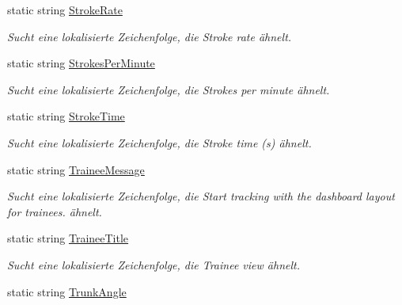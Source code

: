 \begin{DoxyCompactItemize}
static string \hyperlink{class_rowing_monitor_1_1_properties_1_1_resources_aabc0c41d4809bfc5722d408ce806b33f}{Stroke\+Rate}
\begin{DoxyCompactList}\small\item\em Sucht eine lokalisierte Zeichenfolge, die Stroke rate ähnelt. \end{DoxyCompactList}\item 
static string \hyperlink{class_rowing_monitor_1_1_properties_1_1_resources_afb08e8d0b2a23eb35c2474f4da6403f0}{Strokes\+Per\+Minute}
\begin{DoxyCompactList}\small\item\em Sucht eine lokalisierte Zeichenfolge, die Strokes per minute ähnelt. \end{DoxyCompactList}\item 
static string \hyperlink{class_rowing_monitor_1_1_properties_1_1_resources_aab7fa214e8f9007449965d132bbe7d4d}{Stroke\+Time}
\begin{DoxyCompactList}\small\item\em Sucht eine lokalisierte Zeichenfolge, die Stroke time (s) ähnelt. \end{DoxyCompactList}\item 
static string \hyperlink{class_rowing_monitor_1_1_properties_1_1_resources_ad8c651181f3f820b2604964cf28ec195}{Trainee\+Message}
\begin{DoxyCompactList}\small\item\em Sucht eine lokalisierte Zeichenfolge, die Start tracking with the dashboard layout for trainees. ähnelt. \end{DoxyCompactList}\item 
static string \hyperlink{class_rowing_monitor_1_1_properties_1_1_resources_a0208603dd9c860960fd717afc0754559}{Trainee\+Title}
\begin{DoxyCompactList}\small\item\em Sucht eine lokalisierte Zeichenfolge, die Trainee view ähnelt. \end{DoxyCompactList}\item 
static string \hyperlink{class_rowing_monitor_1_1_properties_1_1_resources_acc2d7716003cd33c03211424dc63b7c9}{Trunk\+Angle}

\end{DoxyCompactItemize}
